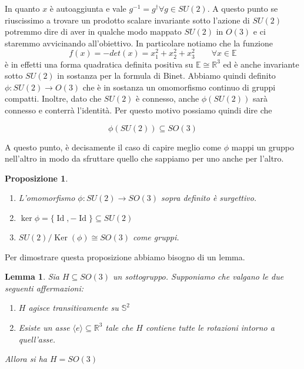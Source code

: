\documentclass[11pt]{article}
\theoremstyle{plain}
\newtheorem{lemma}[thm]{Lemma}
\newtheorem{prop}[thm]{Proposizione}
\theoremstyle{definition}
\theoremstyle{remark}
\newcommand{\R}{\mathbb{R}}
\DeclareMathOperator{\Ker}{Ker}
\DeclareMathOperator{\Id}{Id}
\begin{document}
 In quanto $x$ è autoaggiunta e vale $g^{-1} = g^\dag \forall g \in SU(2)$. A questo punto se riuscissimo a trovare un prodotto scalare invariante sotto l'azione di $SU(2)$ potremmo dire di aver in qualche modo mappato $SU(2)$ in $O(3)$ e ci staremmo avvicinando all'obiettivo. In particolare notiamo che la funzione
 \[ f(x) = -det (x) = x_1 ^2 + x_2^2 + x_3^2 \qquad \forall x \in \mathbb{E}\]
 è in effetti una forma quadratica definita positiva su $\mathbb{E} \cong \R^3$ ed è anche invariante sotto $SU(2)$ in sostanza per la formula di Binet. Abbiamo quindi definito $\phi: SU(2) \to O(3)$ che è in sostanza un omomorfismo continuo di gruppi compatti. Inoltre, dato che $SU(2)$ è connesso, anche $\phi(SU(2))$ sarà connesso e conterrà l'identità. Per questo motivo possiamo quindi dire che

 \[ \phi(SU(2)) \subseteq SO(3) \] 

 A questo punto, è decisamente il caso di capire meglio come $\phi$ mappi un gruppo nell'altro in modo da sfruttare quello che sappiamo per uno anche per l'altro.



 \begin{prop}
   \label{prop:omo su2 so3}
  \begin{enumerate}
    \item L'omomorfismo $\phi : SU(2) \to SO(3)$ sopra definito è surgettivo. 
    \item $\ker \phi = \{\Id, -\Id\}\subseteq SU(2)$
    \item $SU(2) / \Ker(\phi) \cong SO(3)$ come gruppi.
  \end{enumerate}
  \end{prop}

Per dimostrare questa proposizione abbiamo bisogno di un lemma.


\begin{lemma}
  Sia $H \subseteq SO(3)$ un sottogruppo. Supponiamo che valgano le due seguenti affermazioni:

  \begin{enumerate}
  \item $H$ agisce transitivamente su $\mathbb{S}^2$
    \item Esiste un asse $\langle e \rangle \subseteq \R^3$ tale che $H$ contiene tutte le rotazioni intorno a quell'asse.
  \end{enumerate}

  Allora si ha $H = SO(3)$
\end{lemma}
\end{document}
